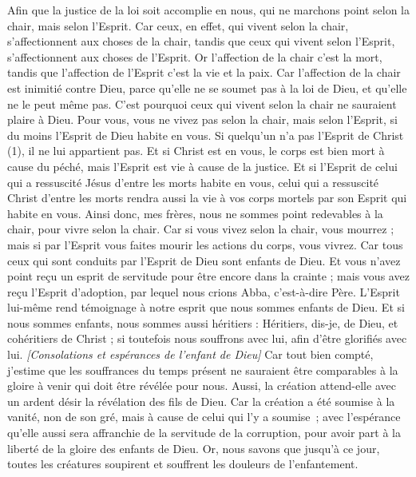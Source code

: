 \begin{multicols}{2}
Afin que la justice de la loi soit accomplie en nous, qui ne marchons point selon la chair, mais selon l'Esprit.
Car ceux, en effet, qui vivent selon la chair, s’affectionnent aux choses de la chair, tandis que ceux qui vivent selon l'Esprit, s’affectionnent aux choses de l'Esprit.
Or l'affection de la chair c’est la mort, tandis que l'affection de l'Esprit c’est la vie et la paix.
Car l'affection de la chair est inimitié contre Dieu, parce qu’elle ne se soumet pas à la loi de Dieu, et qu’elle ne le peut même pas.
C'est pourquoi ceux qui vivent selon la chair ne sauraient plaire à Dieu.
Pour vous, vous ne vivez pas selon la chair, mais selon l'Esprit, si du moins l'Esprit de Dieu habite en vous. Si quelqu'un n'a pas l'Esprit de Christ (1), il ne lui appartient pas.
Et si Christ est en vous, le corps est bien mort à cause du péché, mais l'Esprit est vie à cause de la justice.
Et si l'Esprit de celui qui a ressuscité Jésus d’entre les morts habite en vous, celui qui a ressuscité Christ d’entre les morts rendra aussi la vie à vos corps mortels par son Esprit qui habite en vous.
Ainsi donc, mes frères, nous ne sommes point redevables à la chair, pour vivre selon la chair.
Car si vous vivez selon la chair, vous mourrez ; mais si par l'Esprit vous faites mourir les actions du corps, vous vivrez.
Car tous ceux qui sont conduits par l'Esprit de Dieu sont enfants de Dieu.
Et vous n'avez point reçu un esprit de servitude pour être encore dans la crainte ; mais vous avez reçu l'Esprit d'adoption, par lequel nous crions Abba, c'est-à-dire Père.
L’Esprit lui-même rend témoignage à notre esprit que nous sommes enfants de Dieu.
Et si nous sommes enfants, nous sommes aussi héritiers : Héritiers, dis-je, de Dieu, et cohéritiers de Christ ; si toutefois nous souffrons avec lui, afin d’être glorifiés avec lui.
\textit{[Consolations et espérances de l'enfant de Dieu]}
Car tout bien compté, j'estime que les souffrances du temps présent ne sauraient être comparables à la gloire à venir qui doit être révélée pour nous.
Aussi, la création attend-elle avec un ardent désir la révélation des fils de Dieu.
Car la création a été soumise à la vanité, non de son gré, mais à cause de celui qui l’y a soumise ;
avec l’espérance qu’elle aussi sera affranchie de la servitude de la corruption, pour avoir part à la liberté de la gloire des enfants de Dieu.
Or, nous savons que jusqu’à ce jour, toutes les créatures soupirent et souffrent les douleurs de l’enfantement.

\end{multicols}
